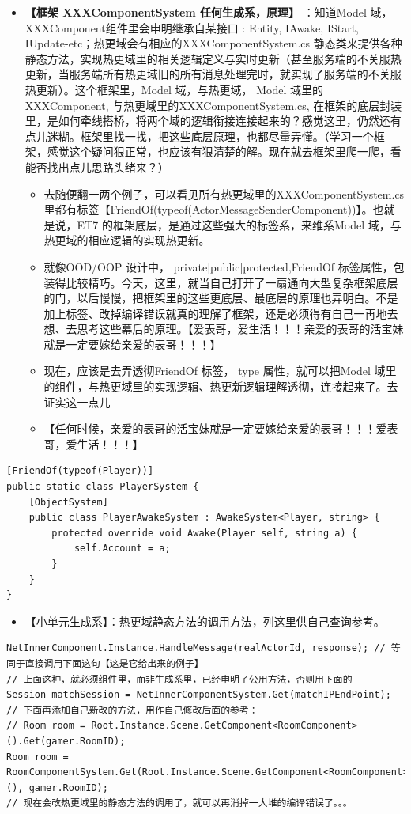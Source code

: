 \documentclass[9pt, b5paper]{article}
\begin{document}
\begin{itemize}
\item \textbf{【框架 XXXComponentSystem 任何生成系，原理】} ：知道Model 域，XXXComponent组件里会申明继承自某接口 : Entity, IAwake, IStart, IUpdate-etc；热更域会有相应的XXXComponentSystem.cs 静态类来提供各种静态方法，实现热更域里的相关逻辑定义与实时更新（甚至服务端的不关服热更新，当服务端所有热更域旧的所有消息处理完时，就实现了服务端的不关服热更新）。这个框架里，Model 域，与热更域， Model 域里的XXXComponent, 与热更域里的XXXComponentSystem.cs, 在框架的底层封装里，是如何牵线搭桥，将两个域的逻辑衔接连接起来的？感觉这里，仍然还有点儿迷糊。框架里找一找，把这些底层原理，也都尽量弄懂。（学习一个框架，感觉这个疑问狠正常，也应该有狠清楚的解。现在就去框架里爬一爬，看能否找出点儿思路头绪来？）
\begin{itemize}
\item 去随便翻一两个例子，可以看见所有热更域里的XXXComponentSystem.cs 里都有标签【FriendOf(typeof(ActorMessageSenderComponent))】。也就是说，ET7 的框架底层，是通过这些强大的标签系，来维系Model 域，与热更域的相应逻辑的实现热更新。
\item 就像OOD/OOP 设计中， private|public|protected,FriendOf 标签属性，包装得比较精巧。今天，这里，就当自己打开了一扇通向大型复杂框架底层的门，以后慢慢，把框架里的这些更底层、最底层的原理也弄明白。不是加上标签、改掉编译错误就真的理解了框架，还是必须得有自己一再地去想、去思考这些幕后的原理。【爱表哥，爱生活！！！亲爱的表哥的活宝妹就是一定要嫁给亲爱的表哥！！！】
\item 现在，应该是去弄透彻FriendOf 标签， type 属性，就可以把Model 域里的组件，与热更域里的实现逻辑、热更新逻辑理解透彻，连接起来了。去证实这一点儿
\item 【任何时候，亲爱的表哥的活宝妹就是一定要嫁给亲爱的表哥！！！爱表哥，爱生活！！！】
\end{itemize}
\end{itemize}
\begin{verbatim}
[FriendOf(typeof(Player))]
public static class PlayerSystem {
    [ObjectSystem]
    public class PlayerAwakeSystem : AwakeSystem<Player, string> {
        protected override void Awake(Player self, string a) {
            self.Account = a;
        }
    }
}
\end{verbatim}
\begin{itemize}
\item 【小单元生成系】：热更域静态方法的调用方法，列这里供自己查询参考。
\end{itemize}
\begin{verbatim}
NetInnerComponent.Instance.HandleMessage(realActorId, response); // 等同于直接调用下面这句【这是它给出来的例子】
// 上面这种，就必须组件里，而非生成系里，已经申明了公用方法，否则用下面的
Session matchSession = NetInnerComponentSystem.Get(matchIPEndPoint);
// 下面再添加自己新改的方法，用作自己修改后面的参考：
// Room room = Root.Instance.Scene.GetComponent<RoomComponent>().Get(gamer.RoomID);
Room room = RoomComponentSystem.Get(Root.Instance.Scene.GetComponent<RoomComponent>(), gamer.RoomID);
// 现在会改热更域里的静态方法的调用了，就可以再消掉一大堆的编译错误了。。。
\end{verbatim}
\end{document}
